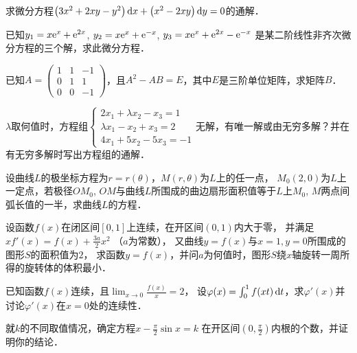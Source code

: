\documentclass[plain,noanswer,medmath]{../../template/jnuexam}
\begin{document}
\begin{problem}
求微分方程$\left(3x^2 + 2xy - y^2 \right)\mathop{}\!\mathrm{d} x + \left(x^2 - 2xy \right)\mathop{}\!\mathrm{d} y = 0$的通解．
\end{problem}


\begin{problem}
已知$y_1 = x\mathrm{e}^x + \mathrm{e}^{2x}$, $y_2 = x\mathrm{e}^x + \mathrm{e}^{- x}$, $y_3 = x\mathrm{e}^x + \mathrm{e}^{2x} - \mathrm{e}^{- x}$
是某二阶线性非齐次微分方程的三个解，求此微分方程．
\end{problem}


\begin{problem}
已知$A = \begin{pmatrix}
  1 & 1 & -1 \\
  0 & 1 & 1 \\
  0 & 0 & -1
\end{pmatrix}$，且$A^2 - AB = E$，其中$E$是三阶单位矩阵，求矩阵$B$．
\end{problem}



\begin{problem}
$\lambda$取何值时，方程组$\begin{cases}
  2x_1 + \lambda x_2 - x_3 = 1 \\
  \lambda x_1 - x_2+ x_3 = 2 \\
  4x_1 + 5x_2 - 5x_3 = - 1
\end{cases}$无解，有唯一解或由无穷多解？并在有无穷多解时写出方程组的通解．
\end{problem}



\begin{problem}
设曲线$L$的极坐标方程为$r = r(\theta)$，$M(r,\theta)$为$L$上的任一点，
$M_0(2,0)$为$L$上一定点，若极径$OM_0$, $OM$与曲线$L$所围成的曲边扇形面积值等于$L$上$M_0$,
 $M$两点间弧长值的一半，求曲线$L$的方程．
\end{problem}



\begin{problem}
设函数$f(x)$在闭区间$[0,1]$上连续，在开区间$(0,1)$内大于零，
并满足$xf'(x) = f(x) + \frac{3a}{2}x^2$ （$a$为常数），
又曲线$y = f(x)$与$x = 1,y = 0$所围成的图形$S$的面积值为$2$，
求函数$y = f(x)$，并问$a$为何值时，图形$S$绕$x$轴旋转一周所得的旋转体的体积最小．
\end{problem}



\begin{problem}
已知函数$f(x)$连续，且$\lim_{x \to 0} \frac{f(x)}{x} = 2$，
设$\varphi (x) = \int_0^1f(xt) \mathop{}\!\mathrm{d} t$，求$\varphi'(x)$并讨论$\varphi'(x)$在$x = 0$处的连续性．
\end{problem}



\begin{problem}
就$k$的不同取值情况，确定方程$x - \frac{\pi}{2}\sin x = k$
在开区间$\left(0,\frac{\pi}{2} \right)$内根的个数，并证明你的结论．
\end{problem}
\end{document}
